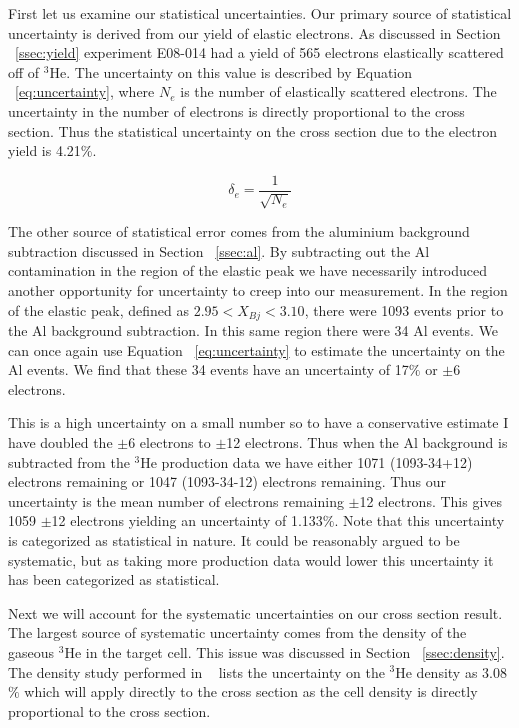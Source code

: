 First let us examine our statistical uncertainties. Our primary source of statistical uncertainty is derived from our yield of elastic electrons. As discussed in Section ~\ref{ssec:yield} experiment E08-014 had a yield of 565 electrons elastically scattered off of $^3$He. The uncertainty on this value is described by Equation ~\ref{eq:uncertainty}, where $N_e$ is the number of elastically scattered electrons. The uncertainty in the number of electrons is directly proportional to the cross section. Thus the statistical uncertainty on the cross section due to the electron yield is 4.21$\%$.

\begin{equation} \label{eq:uncertainty}
	\delta_e = \frac{1}{\sqrt{N_e}}
\end{equation}

The other source of statistical error comes from the aluminium background subtraction discussed in Section ~\ref{ssec:al}. By subtracting out the Al contamination in the region of the elastic peak we have necessarily introduced another opportunity for uncertainty to creep into our measurement. In the region of the elastic peak, defined as $2.95<X_{Bj}<3.10$, there were 1093 events prior to the Al background subtraction. In this same region there were 34 Al events. We can once again use Equation ~\ref{eq:uncertainty} to estimate the uncertainty on the Al events. We find that these 34 events have an uncertainty of 17$\%$ or $\pm$6 electrons. 

This is a high uncertainty on a small number so to have a conservative estimate I have doubled the $\pm$6 electrons to $\pm$12 electrons. Thus when the Al background is subtracted from the $^3$He production data we have either 1071 (1093-34+12) electrons remaining or 1047 (1093-34-12) electrons remaining. Thus our uncertainty is the mean number of electrons remaining $\pm$12 electrons. This gives 1059 $\pm$12 electrons yielding an uncertainty of 1.133$\%$. Note that this uncertainty is categorized as statistical in nature. It could be reasonably argued to be systematic, but as taking more production data would lower this uncertainty it has been categorized as statistical.

Next we will account for the systematic uncertainties on our cross section result. The largest source of systematic uncertainty comes from the density of the gaseous $^3$He in the target cell. This issue was discussed in Section ~\ref{ssec:density}. The density study performed in ~\cite{density} lists the uncertainty on the  $^3$He density as 3.08$\%$ which will apply directly to the cross section as the cell density is directly proportional to the cross section.

